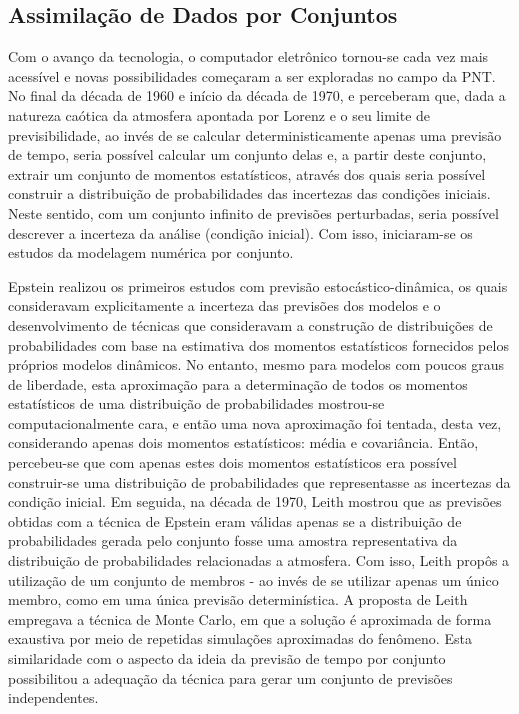 \subsection{Assimilação de Dados por Conjuntos}

Com o avanço da tecnologia, o computador eletrônico tornou-se cada vez mais acessível e novas possibilidades começaram a ser exploradas no campo da PNT. No final da década de 1960 e início da década de 1970,  e  perceberam que, dada a natureza caótica da atmosfera apontada por Lorenz e o seu limite de previsibilidade, ao invés de se calcular deterministicamente apenas uma previsão de tempo, seria possível calcular um conjunto delas e, a partir deste conjunto, extrair um conjunto de momentos estatísticos, através dos quais seria possível construir a distribuição de probabilidades das incertezas das condições iniciais. Neste sentido, com um conjunto infinito de previsões perturbadas, seria possível descrever a incerteza da análise (condição inicial). Com isso, iniciaram-se os estudos da modelagem numérica por conjunto. 

Epstein realizou os primeiros estudos com previsão estocástico-dinâmica, os quais consideravam explicitamente a incerteza das previsões dos modelos e o desenvolvimento de técnicas que consideravam a construção de distribuições de probabilidades com base na estimativa dos momentos estatísticos fornecidos pelos próprios modelos dinâmicos. No entanto, mesmo para modelos com poucos graus de liberdade, esta aproximação para a determinação de todos os momentos estatísticos de uma distribuição de probabilidades mostrou-se computacionalmente cara, e então uma nova aproximação foi tentada, desta vez, considerando apenas dois momentos estatísticos: média e covariância. Então, percebeu-se que com apenas estes dois momentos estatísticos era possível construir-se uma distribuição de probabilidades que representasse as incertezas da condição inicial. Em seguida, na década de 1970, Leith mostrou que as previsões obtidas com a técnica de Epstein eram válidas apenas se a distribuição de probabilidades gerada pelo conjunto fosse uma amostra representativa da distribuição de probabilidades relacionadas a atmosfera. Com isso, Leith propôs a utilização de um conjunto de membros - ao invés de se utilizar apenas um único membro, como em uma única previsão determinística. A proposta de Leith empregava a técnica de Monte Carlo, em que a solução é aproximada de forma exaustiva por meio de repetidas simulações aproximadas do fenômeno. Esta similaridade com o aspecto da ideia da previsão de tempo por conjunto possibilitou a adequação da técnica para gerar um conjunto de previsões independentes. 

